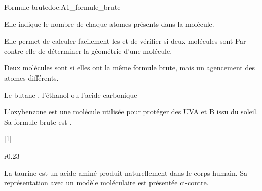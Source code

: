 %



\vspace*{-12pt}

\vspace*{-8pt}
\begin{doc}{Formule brute}{doc:A1_formule_brute}
  \begin{importants}
    Elle indique le nombre de chaque atomes présents dans la molécule.
  \end{importants}
  Elle permet de calculer facilement les  et de vérifier si deux molécules sont 
  Par contre elle  de déterminer la géométrie d'une molécule.

  \begin{importants}
    Deux molécules sont  si elles ont la même formule brute, mais un agencement des atomes différents.
  \end{importants}

  \exemple Le butane , l'éthanol  ou l'acide carbonique 
\end{doc}

L'oxybenzone est une molécule utilisée pour protéger des UVA et B issu du soleil.
Sa formule brute est  .

[1]

\vspace*{8pt}
\begin{wrapfigure}[2]{r}{0.23\linewidth}
  \centering
  \vspace*{-22pt}
\end{wrapfigure}

La taurine est un acide aminé produit naturellement dans le corps humain.
Sa représentation avec un modèle moléculaire est présentée ci-contre.

